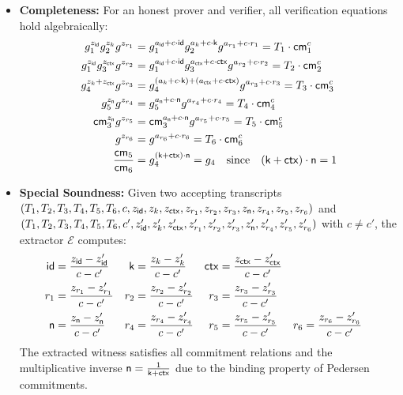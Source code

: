 \begin{itemize}
    \item \textbf{Completeness:} For an honest prover and verifier, all verification equations hold algebraically:
\begin{align*}
        g_1^{z_{\mathsf{id}}} g_2^{z_k} g^{z_{r_1}} &= g_1^{a_{\mathsf{id}} + c \cdot \mathsf{id}} g_2^{a_k + c \cdot \mathsf{k}} g^{a_{r_1} + c \cdot r_1} = T_1 \cdot \mathsf{cm}_1^c \\
        g_1^{z_{\mathsf{id}}} g_3^{z_{\mathsf{ctx}}} g^{z_{r_2}} &= g_1^{a_{\mathsf{id}} + c \cdot \mathsf{id}} g_3^{a_{\mathsf{ctx}} + c \cdot \mathsf{ctx}} g^{a_{r_2} + c \cdot r_2} = T_2 \cdot \mathsf{cm}_2^c \\
        g_4^{z_k + z_{\mathsf{ctx}}} g^{z_{r_3}} &= g_4^{(a_k + c \cdot \mathsf{k}) + (a_{\mathsf{ctx}} + c \cdot \mathsf{ctx})} g^{a_{r_3} + c \cdot r_3} = T_3 \cdot \mathsf{cm}_3^c \\
        g_5^{z_{\textsf{n}}} g^{z_{r_4}} &= g_5^{a_{\textsf{n}} + c \cdot \textsf{n}} g^{a_{r_4} + c \cdot r_4} = T_4 \cdot \mathsf{cm}_4^c \\
        \mathsf{cm}_3^{z_{\textsf{n}}} g^{z_{r_5}} &= \mathsf{cm}_3^{a_{\textsf{n}} + c \cdot \textsf{n}} g^{a_{r_5} + c \cdot r_5} = T_5 \cdot \mathsf{cm}_5^c \\
        g^{z_{r_6}} &= g^{a_{r_6} + c \cdot r_6} = T_6 \cdot \mathsf{cm}_6^c \\
        \frac{\mathsf{cm}_5}{\mathsf{cm}_6} &= g_4^{(\mathsf{k} + \mathsf{ctx}) \cdot \textsf{n}} = g_4 \quad \text{since} \quad (\mathsf{k} + \mathsf{ctx}) \cdot \textsf{n} = 1
    \end{align*}
    
    \item \textbf{Special Soundness:} Given two accepting transcripts $(T_1, T_2, T_3, T_4, T_5, T_6, c, z_{\mathsf{id}}, z_k, z_{\mathsf{ctx}}, z_{r_1}, z_{r_2}, z_{r_3}, z_{\textsf{n}}, z_{r_4}, z_{r_5}, z_{r_6})$ and $(T_1, T_2, T_3, T_4, T_5, T_6, c', z_{\mathsf{id}}', z_k', z_{\mathsf{ctx}}', z_{r_1}', z_{r_2}', z_{r_3}', z_{\textsf{n}}', z_{r_4}', z_{r_5}', z_{r_6}')$ with $c \neq c'$, the extractor $\mathcal{E}$ computes:
    \begin{align*}
        \mathsf{id} &= \frac{z_{\mathsf{id}} - z_{\mathsf{id}}'}{c - c'} & \mathsf{k} &= \frac{z_k - z_k'}{c - c'} & \mathsf{ctx} &= \frac{z_{\mathsf{ctx}} - z_{\mathsf{ctx}}'}{c - c'} \\
        r_1 &= \frac{z_{r_1} - z_{r_1}'}{c - c'} & r_2 &= \frac{z_{r_2} - z_{r_2}'}{c - c'} & r_3 &= \frac{z_{r_3} - z_{r_3}'}{c - c'} \\
        \textsf{n} &= \frac{z_{\textsf{n}} - z_{\textsf{n}}'}{c - c'} & r_4 &= \frac{z_{r_4} - z_{r_4}'}{c - c'} & r_5 &= \frac{z_{r_5} - z_{r_5}'}{c - c'} & r_6 &= \frac{z_{r_6} - z_{r_6}'}{c - c'}
    \end{align*}
    The extracted witness satisfies all commitment relations and the multiplicative inverse $\textsf{n} = \frac{1}{\mathsf{k} + \mathsf{ctx}}$ due to the binding property of Pedersen commitments.
    

\end{itemize}

